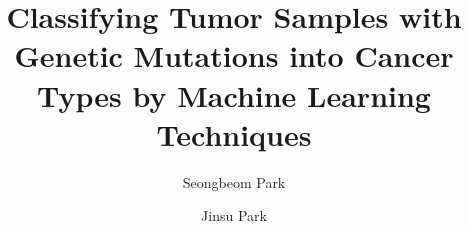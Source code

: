 \documentclass[sigconf, 11pt]{acmart}
\renewcommand\_{\textunderscore\allowbreak}
\newcommand*{\TitleFont}{%
      \usefont{\encodingdefault}{\rmdefault}{b}{n}%
      \fontsize{20}{20}%
      \selectfont}
\begin{document}
\title{\TitleFont Classifying Tumor Samples with Genetic Mutations into Cancer Types by Machine Learning Techniques}

\author{Seongbeom Park}

\author{Jinsu Park}

\maketitle

















\end{document}
